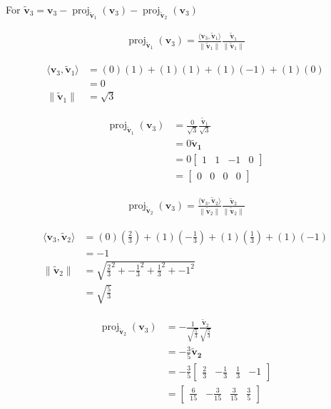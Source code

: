 \documentclass{tufte-book}
\DeclareMathOperator{\proj}{proj}
\newcommand{\vct}{\mathbf}
\newcommand{\dprod}[2]{\langle #1, #2 \rangle}
\theoremstyle{mytheoremstyle}
\theoremstyle{mylemstyle}
\theoremstyle{mydefstyle}
\begin{document}
\begin{enumerate}
For $\vct{\tilde{v}}_3 = \vct{v}_3 - \proj_{\vct{\tilde{v}}_1}(\vct{v}_3)- \proj_{\vct{\tilde{v}}_2}(\vct{v}_3)$

\begin{align*}
\proj_{\vct{\tilde{v}}_1}(\vct{v}_3) = \frac{\dprod{\vct{v}_3}{\vct{\tilde{v}}_1}}{\|\vct{\tilde{v}}_1\|}\frac{\vct{\tilde{v}}_1}{\|\vct{\tilde{v}}_1\|}
\end{align*}

\begin{align*}
\dprod{\vct{v}_3}{\vct{\tilde{v}}_1} &= (0)(1) + (1)(1) + (1)(-1) +(1)(0)\\
&=0 \\
\|\vct{\tilde{v}}_1\| &= \sqrt{3}
\end{align*}

\begin{align*}
\proj_{\vct{\tilde{v}}_1}(\vct{v}_3) &= \frac{0}{\sqrt{3}}\frac{\vct{\tilde{v}}_1}{\sqrt{3}}\\
&= 0\vct{\tilde{v}_1}\\
&=0
\begin{bmatrix}
1 & 1 & -1 & 0
\end{bmatrix} \\
&=
\begin{bmatrix}
0 & 0 &0 & 0
\end{bmatrix}
\end{align*}

\begin{align*}
\proj_{\vct{\tilde{v}}_2}(\vct{v}_3) = \frac{\dprod{\vct{v}_3}{\vct{\tilde{v}}_2}}{\|\vct{\tilde{v}}_2\|}\frac{\vct{\tilde{v}}_2}{\|\vct{\tilde{v}}_2\|}
\end{align*}

\begin{align*}
\dprod{\vct{v}_3}{\vct{\tilde{v}}_2} &= (0)(\frac{2}{3}) + (1)({-\frac{1}{3}}) + (1)(\frac{1}{3}) +(1)(-1)\\
&=-1 \\
\|\vct{\tilde{v}}_2\| &= \sqrt{\frac{2}{3}^2+{-\frac{1}{3}}^2+\frac{1}{3}^2+-1^2} \\
&= \sqrt{\frac{5}{3}}
\end{align*}

\begin{align*}
\proj_{\vct{\tilde{v}}_2}(\vct{v}_3) &= -\frac{1}{\sqrt{\frac{5}{3}}}\frac{\vct{\tilde{v}}_2}{\sqrt{\frac{5}{3}}}\\
&= -\frac{3}{5}\vct{\tilde{v}_2}\\
&= -\frac{3}{5}
\begin{bmatrix}
\frac{2}{3} & -\frac{1}{3} &\frac{1}{3} & -1
\end{bmatrix} \\
&=
\begin{bmatrix}
\frac{6}{15} & {-\frac{3}{15}} &\frac{3}{15} & \frac{3}{5}
\end{bmatrix}
\end{align*}


\end{enumerate}
\end{document}
